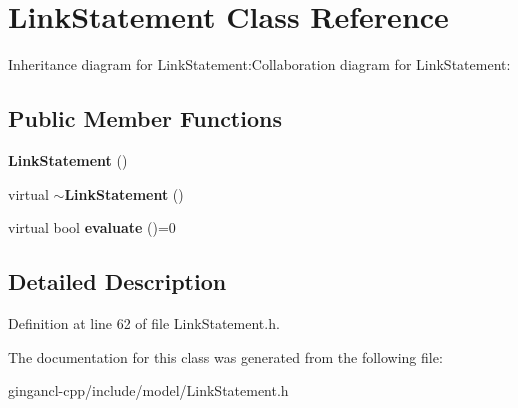 \section{LinkStatement Class Reference}
\label{classbr_1_1pucrio_1_1telemidia_1_1ginga_1_1ncl_1_1model_1_1link_1_1LinkStatement}
Inheritance diagram for LinkStatement:Collaboration diagram for LinkStatement:\subsection*{Public Member Functions}
\begin{CompactItemize}
\item 
{\bf LinkStatement} ()\label{classbr_1_1pucrio_1_1telemidia_1_1ginga_1_1ncl_1_1model_1_1link_1_1LinkStatement_29557ce9600aa6aadcfd5f4b13035ecb}

\item 
virtual {\bf $\sim$LinkStatement} ()\label{classbr_1_1pucrio_1_1telemidia_1_1ginga_1_1ncl_1_1model_1_1link_1_1LinkStatement_33e1b0db36869820d82b568c09a2f6d6}

\item 
virtual bool \textbf{evaluate} ()=0\label{classbr_1_1pucrio_1_1telemidia_1_1ginga_1_1ncl_1_1model_1_1link_1_1LinkStatement_e5886c36588bda2aa2ee8e1dc9223371}

\end{CompactItemize}


\subsection{Detailed Description}




Definition at line 62 of file LinkStatement.h.

The documentation for this class was generated from the following file:\begin{CompactItemize}
\item 
gingancl-cpp/include/model/LinkStatement.h\end{CompactItemize}
